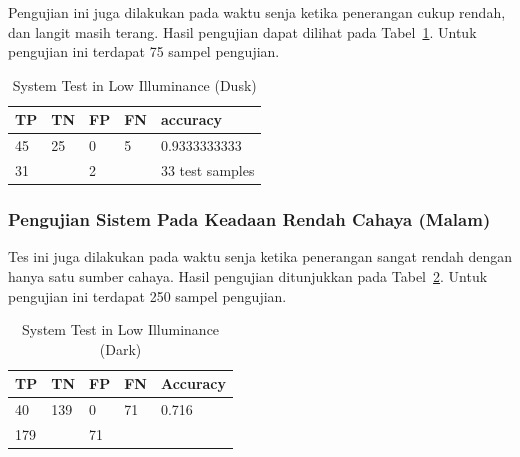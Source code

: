 \par Pengujian ini juga dilakukan pada waktu senja ketika penerangan cukup rendah, dan langit masih terang. Hasil pengujian dapat dilihat pada Tabel~\ref{tb:systest_lowillum_dusk}. Untuk pengujian ini terdapat 75 sampel pengujian.


\begin{table}
  \centering
  \caption{System Test in Low Illuminance (Dusk)}
  \label{tb:systest_lowillum_dusk}
  \begin{tabular}{|l|l|l|l|l|} 
  \hline
  TP & TN                    & FP & FN                & accuracy         \\ 
  \hline
  45 & 25                    & 0  & 5                 & 0.9333333333    \\ 
  \hline
  \multicolumn{2}{|l|}{31}   & \multicolumn{2}{l|}{2} & 33 test samples  \\
  \hline
  \end{tabular}
\end{table}

\subsubsection{Pengujian Sistem Pada Keadaan Rendah Cahaya (Malam)}
\label{subsubsec:hedect_test_lowillum_dark}


\par Tes ini juga dilakukan pada waktu senja ketika penerangan sangat rendah dengan hanya satu sumber cahaya. Hasil pengujian ditunjukkan pada Tabel~\ref{tb:systest_lowillum_dark}. Untuk pengujian ini terdapat 250 sampel pengujian.

\begin{table}
  \centering
  \caption{System Test in Low Illuminance (Dark)}
  \label{tb:systest_lowillum_dark}
  \begin{tabular}{|l|l|l|l|l|} 
    \hline
    TP & TN                     & FP & FN                 & Accuracy  \\ 
    \hline
    40 & 139                    & 0  & 71                 & 0.716     \\ 
    \hline
    \multicolumn{2}{|l|}{179}   & \multicolumn{2}{l|}{71} &           \\
    \hline
  \end{tabular}
\end{table}

